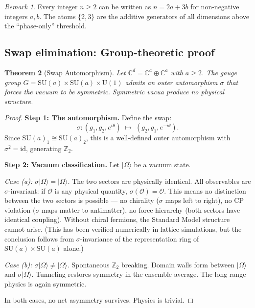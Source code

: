 \documentclass[12pt]{article}
\newtheorem{theorem}{Theorem}[section]
\theoremstyle{remark}
\newtheorem{remark}[theorem]{Remark}
\theoremstyle{definition}
\begin{document}
\begin{remark}
Every integer $n \geq 2$ can be written as $n = 2a + 3b$ for non-negative integers $a, b$. The atoms $\{2, 3\}$ are the additive generators of all dimensions above the ``phase-only'' threshold.
\end{remark}

\subsection{Swap elimination: Group-theoretic proof}

\begin{theorem}[Swap Automorphism]
\label{thm:swap}
Let $\mathbb{C}^d = \mathbb{C}^a \oplus \mathbb{C}^a$ with $a \geq 2$. The gauge group $G = \text{SU}(a) \times \text{SU}(a) \times \text{U}(1)$ admits an outer automorphism $\sigma$ that forces the vacuum to be symmetric. Symmetric vacua produce no physical structure.
\end{theorem}

\begin{proof}
\textbf{Step 1: The automorphism.}
Define the swap:
\begin{equation}
\sigma: (g_1, g_2, e^{i\theta}) \;\mapsto\; (g_2, g_1, e^{-i\theta}).
\end{equation}
Since $\text{SU}(a)_1 \cong \text{SU}(a)_2$, this is a well-defined outer automorphism with $\sigma^2 = \text{id}$, generating $\mathbb{Z}_2$.

\textbf{Step 2: Vacuum classification.}
Let $|\Omega\rangle$ be a vacuum state.

\emph{Case (a): $\sigma|\Omega\rangle = |\Omega\rangle$.}
The two sectors are physically identical. All observables are $\sigma$-invariant: if $\mathcal{O}$ is any physical quantity, $\sigma(\mathcal{O}) = \mathcal{O}$. This means no distinction between the two sectors is possible --- no chirality ($\sigma$ maps left to right), no CP violation ($\sigma$ maps matter to antimatter), no force hierarchy (both sectors have identical coupling). Without chiral fermions, the Standard Model structure cannot arise. (This has been verified numerically in lattice simulations, but the conclusion follows from $\sigma$-invariance of the representation ring of $\text{SU}(a) \times \text{SU}(a)$ alone.)

\emph{Case (b): $\sigma|\Omega\rangle \neq |\Omega\rangle$.}
Spontaneous $\mathbb{Z}_2$ breaking. Domain walls form between $|\Omega\rangle$ and $\sigma|\Omega\rangle$. Tunneling restores symmetry in the ensemble average. The long-range physics is again symmetric.

In both cases, no net asymmetry survives. Physics is trivial.
\end{proof}
\end{document}
